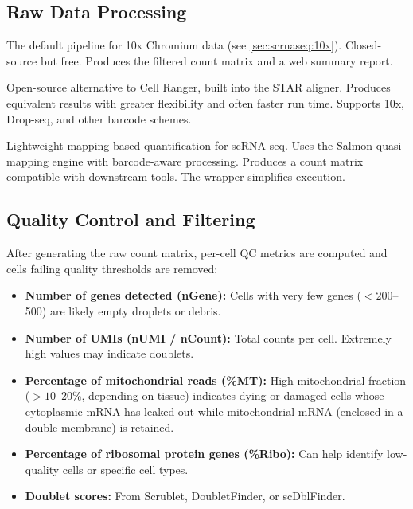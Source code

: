 \subsection{Raw Data Processing}

\begin{description}[style=nextline]
  \item[\software{Cell Ranger}] The default pipeline for 10x Chromium data (see
    \cref{sec:scrnaseq:10x}). Closed-source but free. Produces the filtered
    count matrix and a web summary report.
  \item[\software{STARsolo}] Open-source alternative to Cell Ranger, built into
    the STAR aligner. Produces equivalent results with greater flexibility and
    often faster run time. Supports 10x, Drop-seq, and other barcode schemes.
  \item[\software{alevin-fry} (Salmon)] Lightweight mapping-based quantification
    for scRNA-seq. Uses the Salmon quasi-mapping engine with barcode-aware
    processing. Produces a count matrix compatible with downstream tools. The
     wrapper simplifies execution.
\end{description}

\subsection{Quality Control and Filtering}

After generating the raw count matrix, per-cell QC metrics are computed and
cells failing quality thresholds are removed:

\begin{itemize}[nosep]
  \item \textbf{Number of genes detected (nGene):} Cells with very few genes
    ($< 200$--500) are likely empty droplets or debris.
  \item \textbf{Number of UMIs (nUMI / nCount):} Total counts per cell.
    Extremely high values may indicate doublets.
  \item \textbf{Percentage of mitochondrial reads (\%MT):} High mitochondrial
    fraction ($> 10$--20\%, depending on tissue) indicates dying or damaged
    cells whose cytoplasmic mRNA has leaked out while mitochondrial mRNA
    (enclosed in a double membrane) is retained.
  \item \textbf{Percentage of ribosomal protein genes (\%Ribo):} Can help
    identify low-quality cells or specific cell types.
  \item \textbf{Doublet scores:} From Scrublet, DoubletFinder, or scDblFinder.
\end{itemize}

